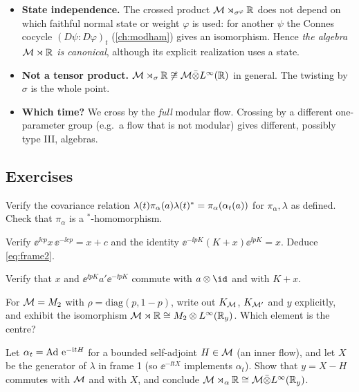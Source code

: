 \begin{whatwrong}
\begin{itemize}
\item \textbf{State independence.} The crossed product $\mathcal{M}\rtimes_{\sigma^\varphi}\mathbb{R}$ does not depend on which faithful normal state or weight $\varphi$ is used: for another $\psi$ the Connes cocycle $(D\psi:D\varphi)_t$ (\cref{ch:modham}) gives an isomorphism. Hence \emph{the algebra $\mathcal{M}\rtimes\mathbb{R}$ is canonical}, although its explicit realization uses a state.
\item \textbf{Not a tensor product.} $\mathcal{M}\rtimes_\sigma\mathbb{R}\not\cong\mathcal{M}\bar\otimes L^\infty(\mathbb{R})$ in general. The twisting by $\sigma$ is the whole point.
\item \textbf{Which time?} We cross by the \emph{full} modular flow. Crossing by a different one-parameter group (e.g.\ a flow that is not modular) gives different, possibly type III, algebras.
\end{itemize}
\end{whatwrong}

\subsection*{Exercises}
\begin{exercise}\label{ex:crossed:1}
Verify the covariance relation $\lambda(t)\pi_\alpha(a)\lambda(t)^{*}=\pi_\alpha(\alpha_t(a))$ for $\pi_\alpha,\lambda$ as defined. Check that $\pi_\alpha$ is a $^*$-homomorphism.
\end{exercise}
\begin{exercise}\label{ex:crossed:2}
Verify $\ee^{\ii cp}x\,\ee^{-\ii cp}=x+c$ and the identity $\ee^{-\ii pK}(K+x)\ee^{\ii pK}=x$. Deduce \eqref{eq:frame2}.
\end{exercise}
\begin{exercise}\label{ex:crossed:3}
Verify that $x$ and $\ee^{\ii pK}a'\ee^{-\ii pK}$ commute with $a\otimes\id$ and with $K+x$.
\end{exercise}
\begin{exercise}\label{ex:crossed:4}
For $\mathcal{M}=M_2$ with $\rho=\mathrm{diag}(p,1-p)$, write out $K_{\mathcal{M}}$, $K_{\mathcal{M}'}$ and $y$ explicitly, and exhibit the isomorphism $\mathcal{M}\rtimes\mathbb{R}\cong M_2\otimes L^\infty(\mathbb{R}_y)$. Which element is the centre?
\end{exercise}
\begin{exercise}\label{ex:crossed:5}
Let $\alpha_t=\operatorname{Ad}\,\mathrm{e}^{-\mathrm{i} tH}$ for a bounded self-adjoint $H\in\mathcal{M}$ (an inner flow), and let $X$ be the generator of $\lambda$ in frame 1 (so $\ee^{-\ii tX}$ implements $\alpha_t$). Show that $y=X-H$ commutes with $\mathcal{M}$ and with $X$, and conclude $\mathcal{M}\rtimes_\alpha\mathbb{R}\cong\mathcal{M}\bar\otimes L^\infty(\mathbb{R}_y)$.
\end{exercise}

